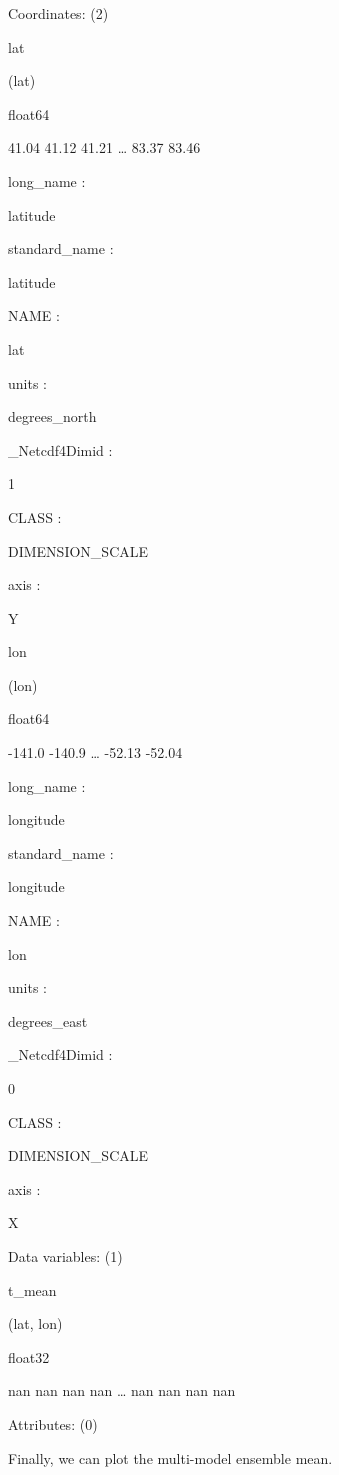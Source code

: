 \documentclass[
]{book}
\begin{document}
Coordinates: {(2)}

{lat}

(lat)

float64

41.04 41.12 41.21 \ldots{} 83.37 83.46

{long\_name :}

latitude

{standard\_name :}

latitude

{NAME :}

lat

{units :}

degrees\_north

\_Netcdf4Dimid :

1

{CLASS :}

DIMENSION\_SCALE

{axis :}

Y

{lon}

(lon)

float64

-141.0 -140.9 \ldots{} -52.13 -52.04

{long\_name :}

longitude

{standard\_name :}

longitude

{NAME :}

lon

{units :}

degrees\_east

\_Netcdf4Dimid :

0

{CLASS :}

DIMENSION\_SCALE

{axis :}

X

Data variables: {(1)}

{t\_mean}

(lat, lon)

float32

nan nan nan nan \ldots{} nan nan nan nan

Attributes: {(0)}

Finally, we can plot the multi-model ensemble mean.
\end{document}
